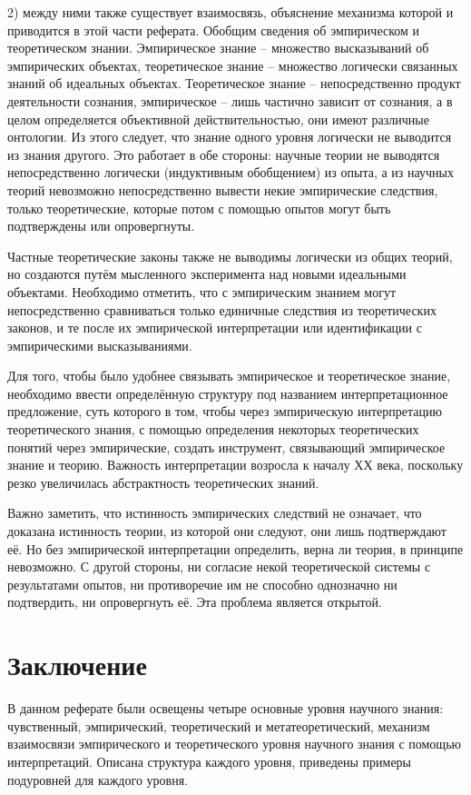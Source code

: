 \documentclass[14pt]{article}
\begin{document}
2) между ними также существует взаимосвязь, объяснение механизма которой и приводится в этой части реферата.  
Обобщим сведения об эмпирическом и теоретическом знании.
Эмпирическое знание -- множество высказываний об эмпирических объектах, теоретическое знание -- множество логически связанных знаний об идеальных объектах. Теоретическое знание -- непосредственно продукт деятельности сознания, эмпирическое -- лишь частично зависит от сознания, а в целом определяется объективной действительностью, они имеют различные онтологии. Из этого следует, что знание одного уровня логически не выводится из знания другого. Это работает в обе стороны:  научные теории не выводятся непосредственно логически (индуктивным обобщением)  из опыта, а из научных теорий невозможно непосредственно вывести некие эмпирические следствия, только теоретические, которые потом с помощью опытов могут быть подтверждены или опровергнуты.
  
Частные теоретические законы также не выводимы логически из общих теорий, но создаются путём мысленного эксперимента над новыми идеальными объектами. Необходимо отметить, что с эмпирическим знанием могут непосредственно сравниваться только единичные следствия из теоретических законов, и те после их эмпирической интерпретации или идентификации с эмпирическими высказываниями.
  
Для того, чтобы было удобнее связывать эмпирическое и теоретическое знание, необходимо ввести определённую структуру под названием интерпретационное предложение, суть которого в том, чтобы через эмпирическую интерпретацию теоретического знания, с помощью определения некоторых теоретических понятий через эмпирические, создать инструмент, связывающий эмпирическое знание и теорию. Важность интерпретации возросла к началу ХХ века, поскольку резко увеличилась абстрактность теоретических знаний.

Важно заметить, что истинность эмпирических следствий не означает, что доказана истинность теории, из которой они следуют, они лишь подтверждают её. Но без эмпирической интерпретации определить, верна ли теория, в принципе невозможно. С другой стороны, ни согласие некой теоретической системы с результатами опытов, ни противоречие им не способно однозначно ни подтвердить, ни опровергнуть её. Эта проблема является открытой.
\section{Заключение}

В данном реферате были освещены четыре основные уровня научного знания: чувственный, эмпирический, теоретический и метатеоретический, механизм взаимосвязи эмпирического и теоретического уровня научного знания с помощью интерпретаций. Описана структура каждого уровня, приведены примеры подуровней для каждого уровня.
\newpage
\end{document}
